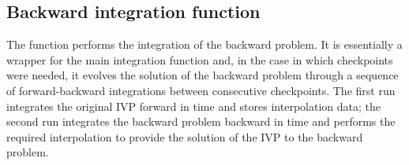 \subsection{Backward integration function}
\label{sss:idasolveb}

The function  performs the integration of the backward problem.
It is essentially a wrapper for the {\idas} main integration function 
 and, in the case in which checkpoints were needed, it evolves 
the solution of the backward problem through a sequence of forward-backward 
integrations between consecutive checkpoints. 
The first run integrates the original IVP forward in time and
stores interpolation data; the second run integrates the backward problem 
backward in time and performs the required interpolation to provide
the solution of the IVP to the backward problem.

